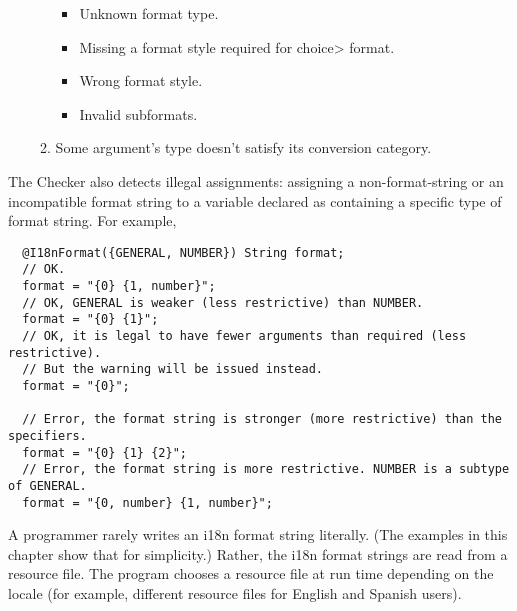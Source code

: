 \begin{enumerate}
\begin{enumerate}
\begin{itemize}
          \item Unknown format type.


          \item Missing a format style required for \<choice> format.


          \item Wrong format style.


          \item Invalid subformats.

        \end{itemize}

      \item Some argument's type doesn't satisfy its conversion category.

    \end{enumerate}
\end{enumerate}

The Checker also detects illegal assignments: assigning a non-format-string
or an incompatible format string to a variable declared as containing a
specific type of format string. For example,

\begin{Verbatim}
  @I18nFormat({GENERAL, NUMBER}) String format;
  // OK.
  format = "{0} {1, number}";
  // OK, GENERAL is weaker (less restrictive) than NUMBER.
  format = "{0} {1}";
  // OK, it is legal to have fewer arguments than required (less restrictive).
  // But the warning will be issued instead.
  format = "{0}";

  // Error, the format string is stronger (more restrictive) than the specifiers.
  format = "{0} {1} {2}";
  // Error, the format string is more restrictive. NUMBER is a subtype of GENERAL.
  format = "{0, number} {1, number}";
\end{Verbatim}


A programmer rarely writes an i18n format string literally. (The examples
in this chapter show that for simplicity.) Rather, the i18n format strings are
read from a resource file.  The program chooses a resource file at run time
depending on the locale (for example, different resource files for English
and Spanish users).

